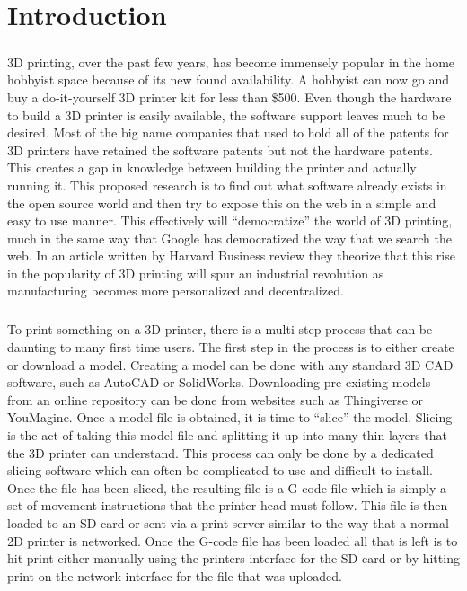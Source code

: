 \chapter{Introduction}
\paragraph{}
3D printing, over the past few years, has become immensely popular in the home hobbyist space because of its new found availability. 
A hobbyist can now go and buy a do-it-yourself 3D printer kit for less than \$500.
Even though the hardware to build a 3D printer is easily available, the software support leaves much to be desired.
Most of the big name companies that used to hold all of the patents for 3D printers have retained the software patents but not the hardware patents. 
This creates a gap in knowledge between building the printer and actually running it.
This proposed research is to find out what software already exists in the open source world and then try to expose this on the web in a simple and easy to use manner.
This effectively will “democratize” the world of 3D printing, much in the same way that Google has democratized the way that we search the web. 
In an article written by Harvard Business review they theorize that this rise in the popularity of 3D printing will spur an industrial revolution as manufacturing becomes more personalized and decentralized. \citet{daveni-2015}

\paragraph{}
To print something on a 3D printer, there is a multi step process that can be daunting to many first time users. 
The first step in the process is to either create or download a model.
Creating a model can be done with any standard 3D CAD software, such as AutoCAD or SolidWorks.
Downloading pre-existing models from an online repository can be done from websites such as Thingiverse or YouMagine.
Once a model file is obtained, it is time to “slice” the model.
Slicing is the act of taking this model file and splitting it up into many thin layers that the 3D printer can understand.
This process can only be done by a dedicated slicing software which can often be complicated to use and difficult to install.
Once the file has been sliced, the resulting file is a G-code file which is simply a set of movement instructions that the printer head must follow.
This file is then loaded to an SD card or sent via a print server similar to the way that a normal 2D printer is networked.
Once the G-code file has been loaded all that is left is to hit print either manually using the printers interface for the SD card or by hitting print on the network interface for the file that was uploaded.

